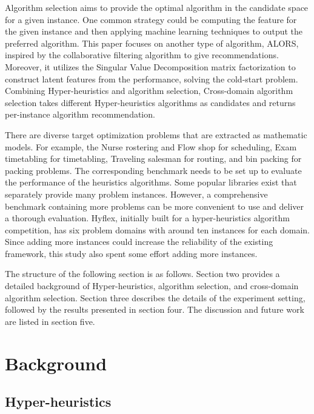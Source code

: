 \documentclass[preprint,review,12pt]{elsarticle}
\begin{document}
Algorithm selection aims to provide the optimal algorithm in the candidate space for a given instance.  One common strategy could be computing the feature for the given instance and then applying machine learning techniques to output the preferred algorithm. This paper focuses on another type of algorithm, ALORS, inspired by the collaborative filtering algorithm to give recommendations. Moreover, it utilizes the Singular Value Decomposition matrix factorization to construct latent features from the performance, solving the cold-start problem. Combining Hyper-heuristics and algorithm selection, Cross-domain algorithm selection takes different Hyper-heuristics algorithms as candidates and returns per-instance algorithm recommendation.

There are diverse target optimization problems that are extracted as mathematic models. For example, the Nurse rostering and Flow shop for scheduling, Exam timetabling for timetabling, Traveling salesman for routing, and bin packing for packing problems. The corresponding benchmark needs to be set up to evaluate the performance of the heuristics algorithms. Some popular libraries exist that separately provide many problem instances. However, a comprehensive benchmark containing more problems can be more convenient to use and deliver a thorough evaluation. Hyflex, initially built for a hyper-heuristics algorithm competition, has six problem domains with around ten instances for each domain. Since adding more instances could increase the reliability of the existing framework, this study also spent some effort adding more instances. 

The structure of the following section is as follows. Section two provides a detailed background of Hyper-heuristics, algorithm selection, and cross-domain algorithm selection. Section three describes the details of the experiment setting, followed by the results presented in section four. The discussion and future work are listed in section five. 



  


\section{Background}
\label{sec:lit}
\subsection{Hyper-heuristics}
\end{document}
